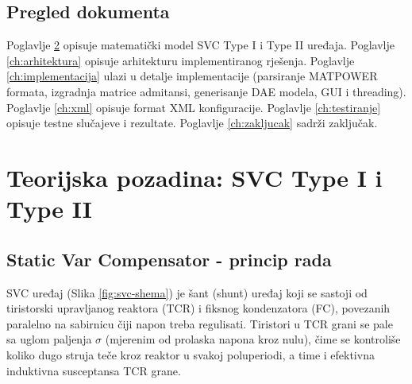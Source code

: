\documentclass[11pt,a4paper]{report}
\begin{document}
\section{Pregled dokumenta}

Poglavlje \ref{ch:teorija} opisuje matematički model SVC Type I i Type II uređaja.
Poglavlje \ref{ch:arhitektura} opisuje arhitekturu implementiranog rješenja. Poglavlje
\ref{ch:implementacija} ulazi u detalje implementacije (parsiranje MATPOWER formata,
izgradnja matrice admitansi, generisanje DAE modela, GUI i threading). Poglavlje
\ref{ch:xml} opisuje format XML konfiguracije. Poglavlje \ref{ch:testiranje} opisuje
testne slučajeve i rezultate. Poglavlje \ref{ch:zakljucak} sadrži zaključak.


\chapter{Teorijska pozadina: SVC Type I i Type II}
\label{ch:teorija}

\section{Static Var Compensator - princip rada}

SVC uređaj (Slika \ref{fig:svc-shema}) je šant (shunt) uređaj koji se sastoji od
tiristorski upravljanog reaktora (TCR) i fiksnog kondenzatora (FC), povezanih paralelno na
sabirnicu čiji napon treba regulisati. Tiristori u TCR grani se pale sa uglom paljenja
$\sigma$ (mjerenim od prolaska napona kroz nulu), čime se kontroliše koliko dugo struja
teče kroz reaktor u svakoj poluperiodi, a time i efektivna induktivna susceptansa TCR
grane.
\end{document}
